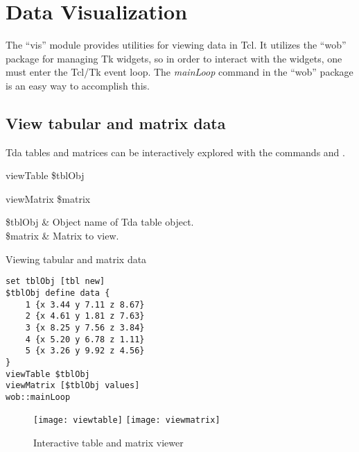 \cleartooddpage[\thispagestyle{empty}]
\chapter{Data Visualization}\label{vis}
The ``vis'' module provides utilities for viewing data in Tcl. It utilizes the ``wob'' package for managing Tk widgets, so in order to interact with the widgets, one must enter the Tcl/Tk event loop. The \textit{mainLoop} command in the ``wob'' package is an easy way to accomplish this.

\clearpage
\section{View tabular and matrix data}
Tda tables and matrices can be interactively explored with the commands  and .

\begin{syntax}
viewTable \$tblObj
\end{syntax}
\begin{syntax}
viewMatrix \$matrix
\end{syntax}
\begin{args}
\$tblObj & Object name of Tda table object. \\
\$matrix  & Matrix to view. 
\end{args}
\begin{example}{Viewing tabular and matrix data}
\begin{lstlisting}
set tblObj [tbl new]
$tblObj define data {
    1 {x 3.44 y 7.11 z 8.67}
    2 {x 4.61 y 1.81 z 7.63}
    3 {x 8.25 y 7.56 z 3.84}
    4 {x 5.20 y 6.78 z 1.11}
    5 {x 3.26 y 9.92 z 4.56}
}
viewTable $tblObj
viewMatrix [$tblObj values]
wob::mainLoop
\end{lstlisting}
\end{example}
\begin{figure}[!htb]
\centering
\texttt{[image: viewtable]}
\texttt{[image: viewmatrix]}
\caption{Interactive table and matrix viewer}
\label{fig:viewdata}
\end{figure}

\clearpage
